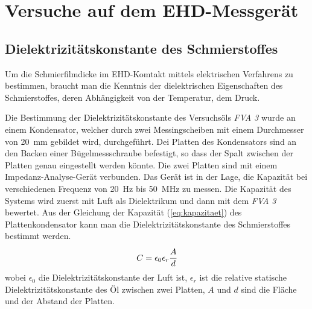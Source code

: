 \chapter{Versuche auf dem EHD-Messgerät}
\label{chap:versuche_auf_dem_ehd_messgeraet}


\section{Dielektrizitätskonstante des Schmierstoffes}
\label{sec:dielektrizitaetskonstate_des_schmierstoffes}

Um die Schmierfilmdicke im EHD-Komtakt mittels elektrischen Verfahrens zu bestimmen, braucht man die Kenntnis der dielektrischen Eigenschaften des Schmierstoffes, deren Abhängigkeit von der Temperatur, dem Druck.

Die Bestimmung der Dielektrizitätskonstante des Versuchsöls \textit{FVA 3} wurde an einem Kondensator, welcher durch zwei Messingscheiben mit einem Durchmesser von \SI{20}{\mm} gebildet wird, durchgeführt.
Dei Platten des Kondensators sind an den Backen einer Bügelmessschraube befestigt, so dass der Spalt zwischen der Platten genau eingestellt werden könnte.
Die zwei Platten sind mit einem Impedanz-Analyse-Gerät verbunden.
Das Gerät ist in der Lage, die Kapazität bei verschiedenen Frequenz von \SI{20}{\Hz} bis \SI{50}{\mega\Hz} zu messen.
Die Kapazität des Systems wird zuerst mit Luft als Dielektrikum und dann mit dem \textit{FVA 3} bewertet.
Aus der Gleichung der Kapazität (\ref{eq:kapazitaet}) des Plattenkondensator kann man die Dielektrizitätskonstante des Schmierstoffes bestimmt werden.
\begin{equation}
    C = \epsilon_0 \epsilon_r \cfrac{A}{d}
    \label{eq:kapazitaet}
\end{equation}
%
wobei $\epsilon_0$ die Dielektrizitätskonstante der Luft ist, $\epsilon_r$ ist die relative statische Dielektrizitätskonstante des Öl zwischen zwei Platten, $A$ und $d$ sind die Fläche und der Abstand der Platten.


